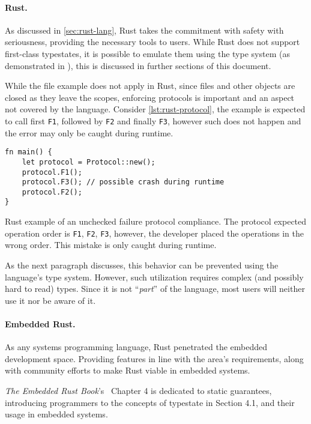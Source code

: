 \paragraph{Rust.}
As discussed in \autoref{sec:rust-lang}, Rust takes the commitment with safety with seriousness,
providing the necessary tools to users.
While Rust does not support first-class typestates,
it is possible to emulate them using the type system (as demonstrated in \autocite{Duarte2020}),
this is discussed in further sections of this document.

While the file example does not apply in Rust, since files and other objects are closed as they leave the scopes,
enforcing protocols is important and an aspect not covered by the language.
Consider \autoref{lst:rust-protocol}, the example is expected to call first \texttt{F1}, followed by \texttt{F2} and finally \texttt{F3},
however such does not happen and the error may only be caught during runtime.

\begin{listing}
    \centering
    \begin{verbatim}
fn main() {
    let protocol = Protocol::new();
    protocol.F1();
    protocol.F3(); // possible crash during runtime
    protocol.F2();
}
    \end{verbatim}
    \caption{
        Rust example of an unchecked failure protocol compliance.
        The protocol expected operation order is \texttt{F1}, \texttt{F2}, \texttt{F3},
        however, the developer placed the operations in the wrong order.
        This mistake is only caught during runtime.
    }
    \label{lst:rust-protocol}
\end{listing}

As the next paragraph discusses, this behavior can be prevented using the language's type system.
However, such utilization requires complex (and possibly hard to read) types.
Since it is not “\emph{part}” of the language, most users will neither use it nor be aware of it.

\paragraph{Embedded Rust.} As any systems programming language, Rust penetrated the embedded development space.
Providing features in line with the area's requirements, along with community efforts to make Rust viable in embedded systems.

\emph{The Embedded Rust Book}'s~\autocite{Rust2021} Chapter 4 is dedicated to static guarantees,
introducing programmers to the concepts of typestate in Section 4.1, and their usage in embedded systems.

